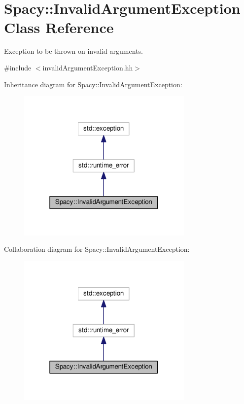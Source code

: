 \hypertarget{classSpacy_1_1InvalidArgumentException}{}\section{Spacy\+:\+:Invalid\+Argument\+Exception Class Reference}
\label{classSpacy_1_1InvalidArgumentException}


Exception to be thrown on invalid arguments.  




{\ttfamily \#include $<$invalid\+Argument\+Exception.\+hh$>$}



Inheritance diagram for Spacy\+:\+:Invalid\+Argument\+Exception\+:\nopagebreak
\begin{figure}[H]
\begin{center}
\leavevmode
\includegraphics[width=244pt]{classSpacy_1_1InvalidArgumentException__inherit__graph}
\end{center}
\end{figure}


Collaboration diagram for Spacy\+:\+:Invalid\+Argument\+Exception\+:\nopagebreak
\begin{figure}[H]
\begin{center}
\leavevmode
\includegraphics[width=244pt]{classSpacy_1_1InvalidArgumentException__coll__graph}
\end{center}
\end{figure}
